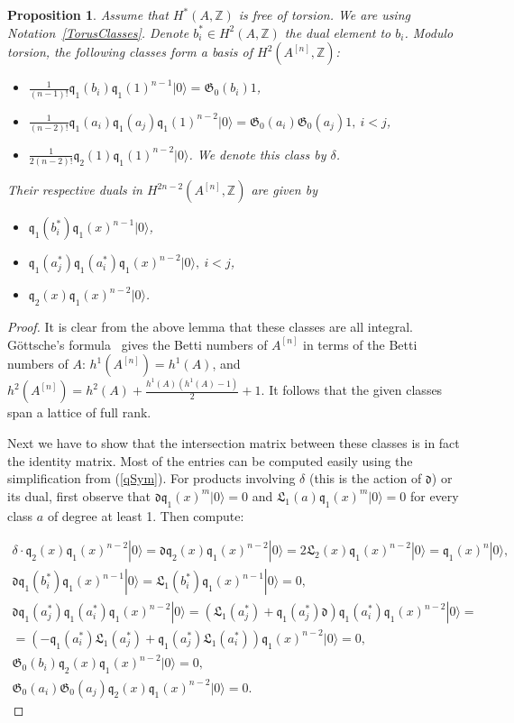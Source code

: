 \documentclass{alggeom}
\newcommand{\hilb}[1]{^{[#1]}}
\newcommand{\vac}{|0\rangle}
\newcommand{\G}{\mathfrak{G}}
\newcommand{\q}{\mathfrak{q}}
\newcommand{\Z}{\mathbb{Z}}
\theoremstyle{plain}
\newtheorem{proposition}[theorem]{Proposition}
\theoremstyle{definition}
\theoremstyle{remark}
\begin{document}
\begin{proposition} Assume that $H^*(A,\Z)$ is free of torsion.
We are using Notation~\ref{TorusClasses}. Denote $b_i^*\in H^2(A,\Z)$ the dual element to $b_i$. 
Modulo torsion, the following classes form a basis of $H^2(A\hilb{n},\Z)$:
\begin{itemize}
 \item[] $\frac{1}{(n-1)!}\q_{1}(b_{i})\q_{1}(1)^{n-1}\vac = \G_0(b_i) 1$,
 \item[] $ \frac{1}{(n-2)!}\q_{1}(a_{i})\q_{1}(a_{j})\q_{1}(1)^{n-2}\vac = \G_0(a_i) \G_0(a_j)1,\  i < j$, 
 \item[] $ \frac{1}{2(n-2)!}\q_{2}(1) \q_{1}(1)^{n-2}\vac$. We denote this class by $\delta$.
\end{itemize}
Their respective duals in $H^{2n-2}(A\hilb{n},\Z)$ are given by
\begin{itemize}
 \item[] $\q_{1}(b_{i}^*)\q_{1}(x)^{n-1}\vac$,
 \item[] $\q_{1}(a_{j}^*)\q_{1}(a_{i}^*)\q_{1}(x)^{n-2}\vac,\  i < j$,
 \item[] $\q_2(x)\q_{1}(x)^{n-2} \vac$.
\end{itemize}
\end{proposition}
\begin{proof} It is clear from the above lemma that these classes are all integral.
G\"ottsche's formula~\cite[p.~35]{Gottsche} gives the Betti numbers of $A\hilb{n}$ in terms of the Betti numbers of $A$: 
$h^1(A\hilb{n}) = h^1(A)$, and $h^2(A\hilb{n}) = h^2(A)+ \frac{h^1(A)(h^1(A)-1)}{2} + 1$. It follows that the given classes span a lattice of full rank.

Next we have to show that the intersection matrix between these classes is in fact the identity matrix. Most of the entries can be computed easily using the simplification from (\ref{qSym}). For products involving $\delta$ (this is the action of $\mathfrak{d}$) or its dual, first observe that $\mathfrak{d}\q_1(x)^m\vac = 0 $ and $ \mathfrak{L}_1(a)\q_1(x)^m\vac =0$ for every class $a$ of degree at least 1. Then compute:

\begin{gather*}
\delta \cdot\q_2(x)\q_{1}(x)^{n-2} \vac = \mathfrak{d}\q_2(x)\q_{1}(x)^{n-2} \vac = 2 \mathfrak{L}_2(x) \q_{1}(x)^{n-2} \vac = \q_{1}(x)^{n}\vac,
\\
\mathfrak{d}\q_{1}(b_{i}^*)\q_{1}(x)^{n-1}\vac =  \mathfrak{L}_1(b_i^*) \q_{1}(x)^{n-1} \vac = 0,
\\
\mathfrak{d}\q_{1}(a_{j}^*)\q_{1}(a_{i}^*)\q_{1}(x)^{n-2}\vac = \left(\mathfrak{L}_1(a_j^*) +\q_{1}(a_{j}^*)\mathfrak{d}\right)\q_{1}(a_{i}^*)\q_{1}(x)^{n-2}\vac = 
  \\ =\left(-\q_1(a_i^*)\mathfrak{L}_1(a_j^*) + \q_{1}(a_{j}^*)\mathfrak{L}_1(a_i^*)\right)\q_{1}(x)^{n-2}\vac  = 0,
\\
\G_0(b_i)\q_2(x)\q_{1}(x)^{n-2} \vac = 0, 
\\
\G_0(a_i)\G_0(a_j)\q_2(x)\q_{1}(x)^{n-2} \vac = 0.
\end{gather*}


\end{proof}
\end{document}
